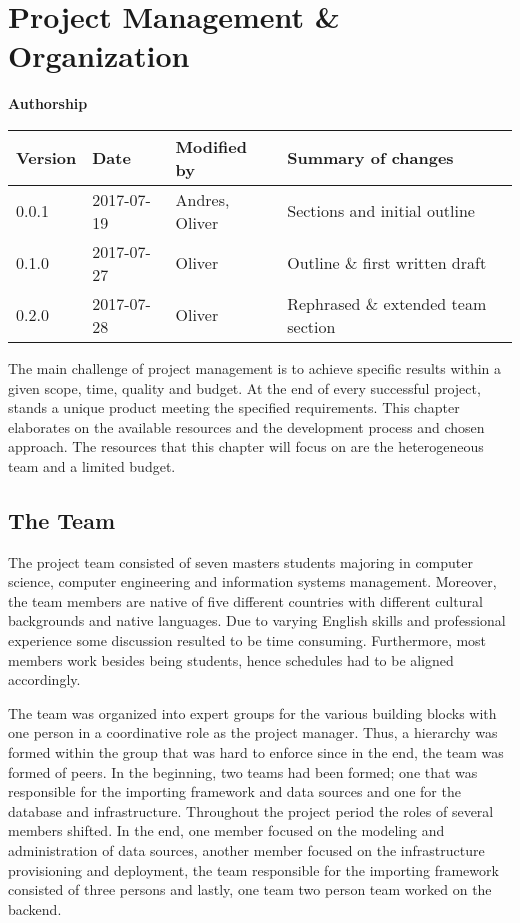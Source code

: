 \section{Project Management \& Organization}\label{sec:organization}

\textbf{Authorship}

\begin{longtable}[]{@{}llll@{}}
\toprule
Version & Date & Modified by & Summary of changes\tabularnewline
\midrule
\endhead
0.0.1 & 2017-07-19 & Andres, Oliver & Sections and initial
outline\tabularnewline
0.1.0 & 2017-07-27 & Oliver & Outline \& first written
draft\tabularnewline
0.2.0 & 2017-07-28 & Oliver & Rephrased \& extended team
section\tabularnewline
\bottomrule
\end{longtable}

The main challenge of project management is to achieve specific results
within a given scope, time, quality and budget. At the end of every
successful project, stands a unique product meeting the specified
requirements. This chapter elaborates on the available resources and the
development process and chosen approach. The resources that this chapter
will focus on are the heterogeneous team and a limited budget.

\subsection{The Team}\label{the-team}

The project team consisted of seven masters students majoring in
computer science, computer engineering and information systems
management. Moreover, the team members are native of five different
countries with different cultural backgrounds and native languages. Due
to varying English skills and professional experience some discussion
resulted to be time consuming. Furthermore, most members work besides
being students, hence schedules had to be aligned accordingly.

The team was organized into expert groups for the various building
blocks with one person in a coordinative role as the project manager.
Thus, a hierarchy was formed within the group that was hard to enforce
since in the end, the team was formed of peers. In the beginning, two
teams had been formed; one that was responsible for the importing
framework and data sources and one for the database and infrastructure.
Throughout the project period the roles of several members shifted. In
the end, one member focused on the modeling and administration of data
sources, another member focused on the infrastructure provisioning and
deployment, the team responsible for the importing framework consisted
of three persons and lastly, one team two person team worked on the
backend.

